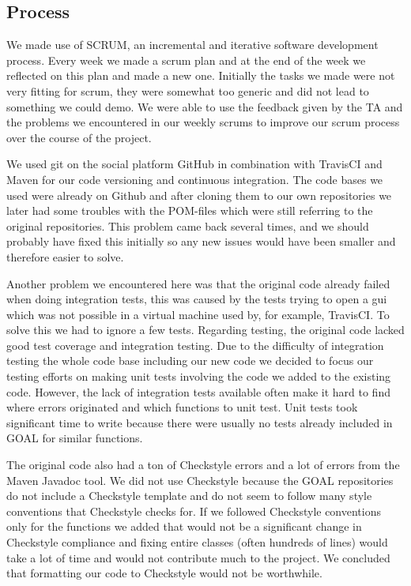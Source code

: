 \documentclass[11pt]{article}
\begin{document}
\subsection{Process}
We made use of \gls{SCRUM}, an incremental and iterative software development process. Every week we made a scrum plan and at the end of the week we reflected on this plan and made a new one. Initially the tasks we made were not very fitting for scrum, they were somewhat too generic and did not lead to something we could demo. We were able to use the feedback given by the TA and the problems we encountered in our weekly scrums to improve our scrum process over the course of the project. \par 
We used git\cite{git} on the social platform GitHub\cite{GitHub} in combination with TravisCI\cite{TravisCI} and Maven\cite{Maven} for our code versioning and continuous integration. The code bases we used were already on Github and after cloning them to our own repositories we later had some troubles with the POM-files which were still referring to the original repositories. This problem came back several times, and we should probably have fixed this initially so any new issues would have been smaller and therefore easier to solve. \par 
Another problem we encountered here was that the original code already failed when doing integration tests, this was caused by the tests trying to open a gui which was not possible in a virtual machine used by, for example, \gls{TravisCI}. To solve this we had to ignore a few tests. Regarding testing, the original code lacked good test coverage and integration testing. Due to the difficulty of integration testing the whole code base including our new code we decided to focus our testing efforts on making unit tests involving the code we added to the existing code. However, the lack of integration tests available often make it hard to find where errors originated and which functions to unit test. Unit tests took significant time to write because there were usually no tests already included in GOAL for similar functions. \par 
The original code also had a ton of Checkstyle errors and a lot of errors from the Maven Javadoc tool. We did not use Checkstyle because the GOAL repositories do not include a Checkstyle template and do not seem to follow many style conventions that Checkstyle checks for. If we followed Checkstyle conventions only for the functions we added that would not be a significant change in Checkstyle compliance and fixing entire classes (often hundreds of lines) would take a lot of time and would not contribute much to the project. We concluded that formatting our code to Checkstyle would not be worthwhile.\\
\end{document}
